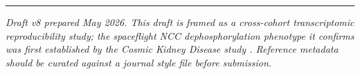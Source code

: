 \documentclass[11pt]{article}
\begin{document}
\vspace{1em}
\begin{center}
\rule{0.4\textwidth}{0.4pt}
\end{center}
\vspace{0.3em}
\noindent\textit{Draft v8 prepared May 2026. This draft is framed as a cross-cohort transcriptomic reproducibility study; the spaceflight NCC dephosphorylation phenotype it confirms was first established by the Cosmic Kidney Disease study \citep{siew2024cosmic}. Reference metadata should be curated against a journal style file before submission.}
\end{document}
